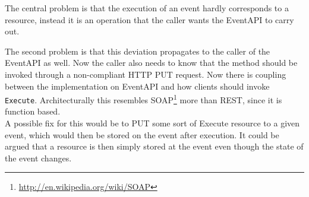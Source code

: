 The central problem is that the execution of an event hardly corresponds to a resource, instead it is an operation that the caller wants the EventAPI to carry out. 

The second problem is that this deviation propagates to the caller of the EventAPI as well. 
Now the caller also needs to know that the method should be invoked through a non-compliant HTTP PUT request. Now there is coupling between the implementation on EventAPI and how clients should invoke \texttt{Execute}. Architecturally this resembles SOAP\footnote{\url{http://en.wikipedia.org/wiki/SOAP}} more than REST, since it is function based.\\

A possible fix for this would be to PUT some sort of Execute resource to a given event, which would then be stored on the event after execution. It could be argued that a resource is then simply stored at the event even though the state of the event changes.